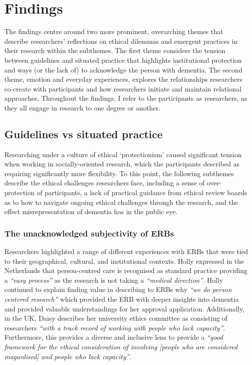\section{Findings}
\label{Ethics:Findings}
The findings centre around two more prominent, overarching themes that describe researchers’ reflections on ethical dilemmas and emergent practices in their research within the subthemes. The first theme considers the tension between guidelines and situated practice that highlights institutional protection and ways (or the lack of) to acknowledge the person with dementia. The second theme, emotion and everyday experiences, explores the relationships researchers co-create with participants and how researchers initiate and maintain relational approaches. Throughout the findings, I refer to the participants as researchers, as they all engage in research to one degree or another.

\subsection{Guidelines vs situated practice}
\label{Ethics:ThemeOne}
Researching under a culture of ethical ‘protectionism’ caused significant tension when working in socially-oriented research, which the participants described as requiring significantly more flexibility. To this point, the following subthemes describe the ethical challenges researchers face, including a sense of over-protection of participants, a lack of practical guidance from ethical review boards as to how to navigate ongoing ethical challenges through the research, and the effect misrepresentation of dementia has in the public eye.

\subsubsection{The unacknowledged subjectivity of ERBs}
\label{Ethics:ThemOnePartOne}
Researchers highlighted a range of different experiences with ERBs that were tied to their geographical, cultural, and institutional contexts. Holly expressed in the Netherlands that person-centred care is recognised as standard practice providing a \textit{“easy process” }as the research is not taking a \textit{“medical direction”}. Holly continued to explain finding value in describing to ERBs why \textit{“we do person centered research”} which provided the ERB with deeper insights into dementia and provided valuable understandings for her approval application. Additionally, in the UK, Daisy describes her university ethics committee as consisting of researchers \textit{“with a track record of working with people who lack capacity”}. Furthermore, this provides a diverse and inclusive lens to provide a \textit{“good framework for the ethical consideration of involving [people who are considered maganlised] and people who lack capacity”}. 

